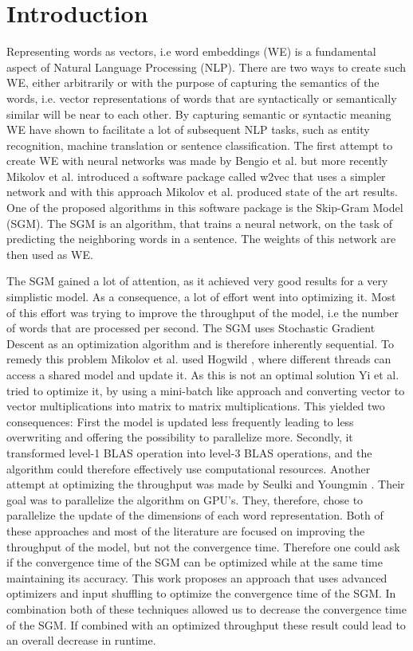 
\section{Introduction}\label{chap:introduction}

Representing words as vectors, i.e word embeddings (WE) is a fundamental aspect of Natural Language Processing (NLP). There are two ways to create such WE, either arbitrarily or with the purpose of capturing the semantics of the words, i.e. vector representations of words that are syntactically or semantically similar will be near to each other. By capturing semantic or syntactic meaning WE have shown to facilitate a lot of subsequent NLP tasks, such as entity recognition, machine translation or sentence classification.  The first attempt to create WE with neural networks was made by Bengio et al. \cite{bengio} but more recently Mikolov et al. \cite{mikolov} introduced a software package called w2vec that uses a simpler network and with this approach Mikolov et al. produced state of the art results. One of the proposed algorithms in this software package is the Skip-Gram Model (SGM). The SGM is an algorithm, that trains a neural network, on the task of predicting the neighboring words in a sentence. The weights of this network are then used as WE. 

The SGM gained a lot of attention, as it achieved very good results for a very simplistic model. As a consequence, a lot of effort went into optimizing it. Most of this effort was trying to improve the throughput of the model, i.e the number of words that are processed per second. The SGM uses Stochastic Gradient Descent as an optimization algorithm and is therefore inherently sequential. To remedy this problem Mikolov et al. used Hogwild \cite{hogwild}, where different threads can access a shared model and update it. As this is not an optimal solution Yi et al. \cite{intel} tried to optimize it, by using a mini-batch like approach and converting vector to vector multiplications into matrix to matrix multiplications. This yielded two consequences: First the model is updated less frequently leading to less overwriting and offering the possibility to parallelize more. Secondly, it transformed level-1 BLAS operation into level-3 BLAS operations, and the algorithm could therefore effectively use computational resources. Another attempt at optimizing the throughput was made by Seulki and Youngmin \cite{gpu}. Their goal was to parallelize the algorithm on GPU's. They, therefore, chose to parallelize the update of the dimensions of each word representation. Both of these approaches and most of the literature are focused on improving the throughput of the model, but not the convergence time.  Therefore one could ask if the convergence time of the SGM can be optimized while at the same time maintaining its accuracy. This work proposes an approach that uses advanced optimizers and input shuffling to optimize the convergence time of the SGM. In combination both of these techniques allowed us to decrease the convergence time of the SGM. If combined with an optimized throughput these result could lead to an overall decrease in runtime.

